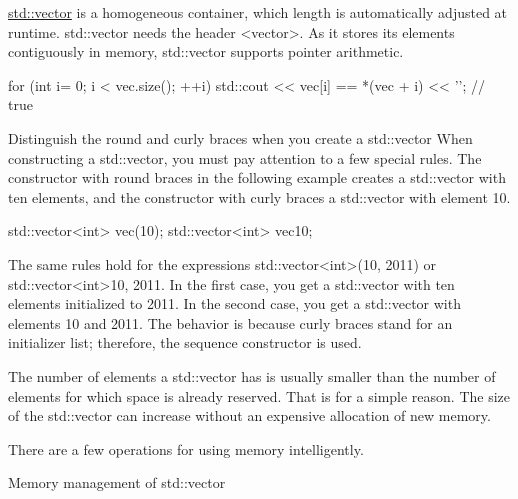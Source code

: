 

\href{http://en.cppreference.com/w/cpp/container/vector}{std::vector} is a homogeneous container, which length is automatically adjusted at runtime. std::vector needs the header <vector>. As it stores its elements contiguously in memory, std::vector supports pointer arithmetic.

\begin{cpp}
for (int i= 0; i < vec.size(); ++i){
	std::cout << vec[i] == *(vec + i) << '\n'; // true
}
\end{cpp}

\begin{myTip}{Distinguish the round and curly braces when you create a std::vector}
When constructing a std::vector, you must pay attention to a few special rules. The constructor with round braces in the following example creates a std::vector with ten elements, and the constructor with curly braces a std::vector with element 10.

\begin{cpp}
std::vector<int> vec(10);
std::vector<int> vec{10};
\end{cpp}

The same rules hold for the expressions std::vector<int>(10, 2011) or std::vector<int>{10, 2011}. In the first case, you get a std::vector with ten elements initialized to 2011. In the second case, you get a std::vector with elements 10 and 2011. The behavior is because curly braces stand for an initializer list; therefore, the sequence constructor is used.
\end{myTip}


The number of elements a std::vector has is usually smaller than the number of elements for which space is already reserved. That is for a simple reason. The size of the std::vector can increase without an expensive allocation of new memory.

There are a few operations for using memory intelligently.

\begin{center}
Memory management of std::vector
\end{center}

